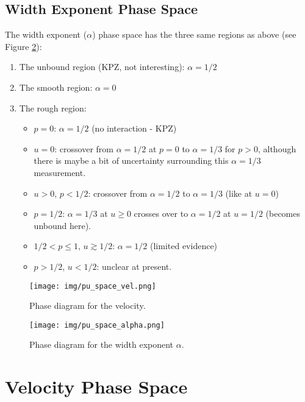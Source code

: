 \documentclass[a4paper,10pt]{article}
\newcommand{\fref}[1]{Figure \ref{#1}}
\begin{document}
\subsection{Width Exponent Phase Space}

The width exponent ($\alpha$) phase space has the three same regions as above (see \fref{fig:pu_space_alpha}):
\begin{enumerate}
 \item The unbound region (KPZ, not interesting): $\alpha = 1/2$
 \item The smooth region: $\alpha = 0$
 \item The rough region:
 \begin{itemize}
  \item $p=0$: $\alpha = 1/2$ (no interaction - KPZ)
  \item $u=0$: crossover from $\alpha = 1/2$ at $p=0$ to $\alpha = 1/3$ for $p > 0$, although there is maybe a bit of uncertainty surrounding this $\alpha = 1/3$ measurement.
  \item $u>0$, $p<1/2$: crossover from $\alpha=1/2$ to $\alpha = 1/3$ (like at $u=0$)
  \item $p=1/2$: $\alpha = 1/3$ at $u\ge0$ crosses over to $\alpha=1/2$ at $u=1/2$ (becomes unbound here).
  \item $1/2<p\le1$, $u \gtrsim 1/2$: $\alpha=1/2$ (limited evidence)
  \item $p>1/2$, $u<1/2$: unclear at present.
 \end{itemize}
\end{enumerate}

\newpage

\begin{figure}[h!]
 \centering
 \texttt{[image: img/pu\_space\_vel.png]}
 \caption{Phase diagram for the velocity.}
 \label{fig:pu_space_vel}
\end{figure}
\begin{figure}[h!]
 \centering
 \texttt{[image: img/pu\_space\_alpha.png]}
 \caption{Phase diagram for the width exponent $\alpha$.}
 \label{fig:pu_space_alpha}
\end{figure}
\newpage

\section{Velocity Phase Space}
\end{document}
